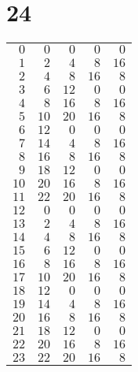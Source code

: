 \documentclass[a4paper]{scrartcl}
\begin{document}
\section*{24}
\begin{tabular}{rrrrr}
\toprule
$0$ & $0$ & $0$ & $0$ & $0$ \\
$1$ & $2$ & $4$ & $8$ & $16$ \\
$2$ & $4$ & $8$ & $16$ & $8$ \\
$3$ & $6$ & $12$ & $0$ & $0$ \\
$4$ & $8$ & $16$ & $8$ & $16$ \\
$5$ & $10$ & $20$ & $16$ & $8$ \\
$6$ & $12$ & $0$ & $0$ & $0$ \\
$7$ & $14$ & $4$ & $8$ & $16$ \\
$8$ & $16$ & $8$ & $16$ & $8$ \\
$9$ & $18$ & $12$ & $0$ & $0$ \\
$10$ & $20$ & $16$ & $8$ & $16$ \\
$11$ & $22$ & $20$ & $16$ & $8$ \\
$12$ & $0$ & $0$ & $0$ & $0$ \\
$13$ & $2$ & $4$ & $8$ & $16$ \\
$14$ & $4$ & $8$ & $16$ & $8$ \\
$15$ & $6$ & $12$ & $0$ & $0$ \\
$16$ & $8$ & $16$ & $8$ & $16$ \\
$17$ & $10$ & $20$ & $16$ & $8$ \\
$18$ & $12$ & $0$ & $0$ & $0$ \\
$19$ & $14$ & $4$ & $8$ & $16$ \\
$20$ & $16$ & $8$ & $16$ & $8$ \\
$21$ & $18$ & $12$ & $0$ & $0$ \\
$22$ & $20$ & $16$ & $8$ & $16$ \\
$23$ & $22$ & $20$ & $16$ & $8$ \\
\bottomrule
\end{tabular}
\end{document}

